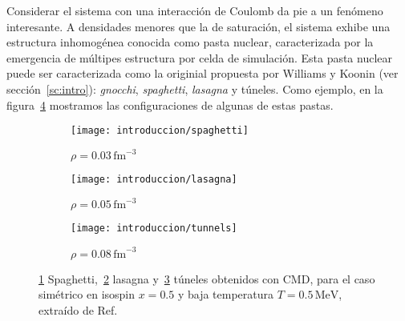 Considerar el sistema con una interacción de Coulomb da pie a un fenómeno interesante.
A densidades menores que la de saturación, el sistema exhibe una estructura inhomogénea conocida como pasta nuclear, caracterizada por la emergencia de múltipes estructura por celda de simulación.
Esta pasta nuclear puede ser caracterizada como la originial propuesta por Williams y Koonin (ver sección~\ref{sc:intro}): \emph{gnocchi}, \emph{spaghetti}, \emph{lasagna} y túneles.
Como ejemplo, en la figura~\ref{fig:pasta} mostramos las configuraciones de algunas de estas pastas.


\begin{figure}[h]
  \begin{subfigure}[h!]{0.45\columnwidth}
    \texttt{[image: introduccion/spaghetti]}
    \caption{$\rho = 0.03\,\text{fm}^{-3}$}
    \label{sfig:spaghetti}
  \end{subfigure}
  \begin{subfigure}[h!]{0.45\columnwidth}
    \texttt{[image: introduccion/lasagna]}
    \caption{$\rho = 0.05\,\text{fm}^{-3}$}
    \label{sfig:lasagna}
  \end{subfigure}
  \begin{subfigure}[h!]{0.45\columnwidth}
    \texttt{[image: introduccion/tunnels]}
    \caption{$\rho = 0.08\,\text{fm}^{-3}$}
    \label{sfig:tunnels}
  \end{subfigure}
  \centering
  \caption{\ref{sfig:spaghetti} Spaghetti,~\ref{sfig:lasagna} lasagna y~\ref{sfig:tunnels} túneles obtenidos con CMD, para el caso simétrico en isospin $x=0.5$ y baja temperatura $T=0.5\,\text{MeV}$, extraído de Ref.~\cite{alcain_effect_2014}}
  \label{fig:pasta}
\end{figure}




